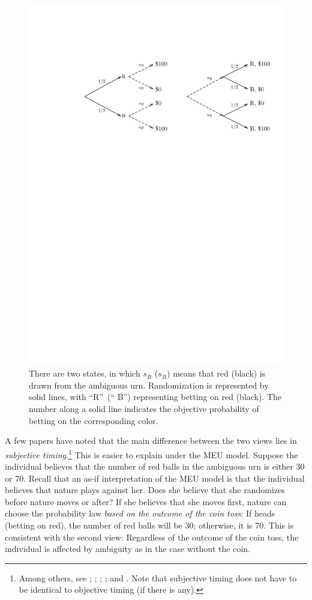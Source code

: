 \documentclass[12pt, notitlepage]{article}
\begin{document}
\begin{figure}[h!]
  \centering   
    \includegraphics{img/eaep.pdf}
    \caption{There are
two states, in which $s_{R}$ ($s_{B}$) means that red (black) is drawn from
the ambiguous urn. Randomization is represented by solid lines, with
\textquotedblleft R\textquotedblright\ (\textquotedblleft
B\textquotedblright ) representing betting on red (black). The number along
a solid line indicates the objective probability of betting on the
corresponding color.}
\label{fig_eaep_intro}
\end{figure}

A few papers have noted that the main difference between the two views lies
in \textit{subjective timing}.\footnote{%
Among others, see \cite{EpsteinMarinacciSeo07}; \cite{Bade15}; \cite%
{BaillonHalevyLi15}; \cite{Saito15}; and \cite{OechsslerRauRoomets19}. Note
that subjective timing does not have to be identical to objective timing (if
there is any).} This is easier to explain under the MEU model. Suppose the
individual believes that the number of red balls in the ambiguous urn is
either 30 or 70. Recall that an as-if interpretation of the MEU model is
that the individual believes that nature plays against her. Does she believe
that she randomizes before nature moves or after? If she believes that she
moves first, nature can choose the probability law \textit{based on the
outcome of the coin toss}: If heads (betting on red), the number of red
balls will be 30; otherwise, it is 70. This is consistent with the second
view: Regardless of the outcome of the coin toss, the individual is affected
by ambiguity as in the case without the coin.
\end{document}
